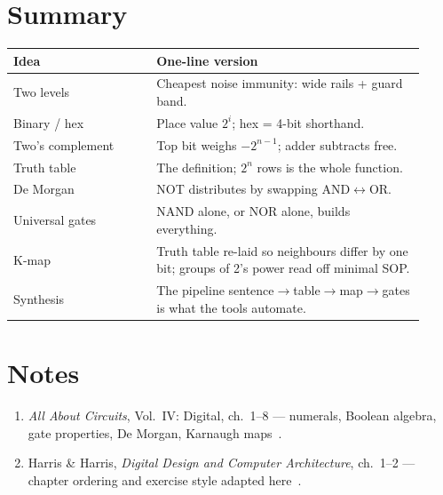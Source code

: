 \section{Summary}
\label{sec:summary08}

\begin{center}\small
\begin{tabular}{@{}p{0.32\linewidth}p{0.60\linewidth}@{}}
\toprule
\textbf{Idea} & \textbf{One-line version} \\ \midrule
Two levels & Cheapest noise immunity: wide rails + guard band. \\
Binary / hex & Place value $2^i$; hex = 4-bit shorthand. \\
Two's complement & Top bit weighs $-2^{n-1}$; adder subtracts free. \\
Truth table & The definition; $2^n$ rows is the whole function. \\
De Morgan & NOT distributes by swapping AND$\leftrightarrow$OR. \\
Universal gates & NAND alone, or NOR alone, builds everything. \\
K-map & Truth table re-laid so neighbours differ by one bit; groups of 2's power read off minimal SOP. \\
Synthesis & The pipeline sentence$\to$table$\to$map$\to$gates is what the tools automate. \\
\bottomrule
\end{tabular}
\end{center}

\section*{Notes}
\begin{enumerate}
\item \emph{All About Circuits}, Vol.~IV: Digital, ch.\ 1--8 — numerals,
Boolean algebra, gate properties, De Morgan, Karnaugh
maps~\cite{aacvol4}.
\item Harris \& Harris, \emph{Digital Design and Computer Architecture},
ch.\ 1--2 — chapter ordering and exercise style adapted
here~\cite{ddca}.
\end{enumerate}


